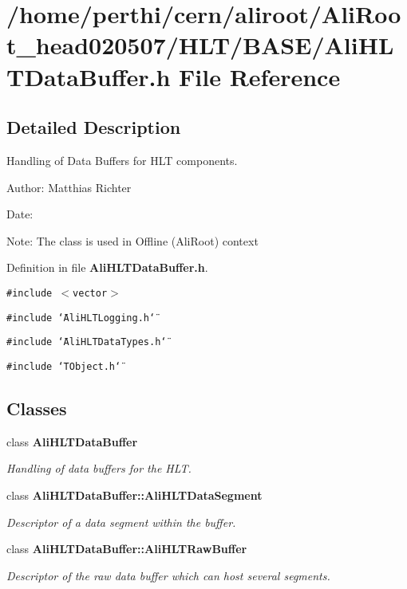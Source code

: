 \section{/home/perthi/cern/aliroot/Ali\-Root\_\-head020507/HLT/BASE/Ali\-HLTData\-Buffer.h File Reference}
\label{AliHLTDataBuffer_8h}


\subsection{Detailed Description}
Handling of Data Buffers for HLT components. 

\begin{Desc}
\item[Author:]Matthias Richter \end{Desc}
\begin{Desc}
\item[Date:]\end{Desc}
\begin{Desc}
\item[Note:]The class is used in Offline (Ali\-Root) context\end{Desc}


Definition in file {\bf Ali\-HLTData\-Buffer.h}.

{\tt \#include $<$vector$>$}\par
{\tt \#include \char`\"{}Ali\-HLTLogging.h\char`\"{}}\par
{\tt \#include \char`\"{}Ali\-HLTData\-Types.h\char`\"{}}\par
{\tt \#include \char`\"{}TObject.h\char`\"{}}\par
\subsection*{Classes}
\begin{CompactItemize}
\item 
class {\bf Ali\-HLTData\-Buffer}
\begin{CompactList}\small\item\em Handling of data buffers for the HLT. \item\end{CompactList}\item 
class {\bf Ali\-HLTData\-Buffer::Ali\-HLTData\-Segment}
\begin{CompactList}\small\item\em Descriptor of a data segment within the buffer. \item\end{CompactList}\item 
class {\bf Ali\-HLTData\-Buffer::Ali\-HLTRaw\-Buffer}
\begin{CompactList}\small\item\em Descriptor of the raw data buffer which can host several segments. \item\end{CompactList}\end{CompactItemize}
